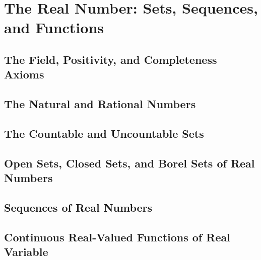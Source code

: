 \section{The Real Number: Sets, Sequences, and Functions}

\subsection{The Field, Positivity, and Completeness Axioms}


\subsection{The Natural and Rational Numbers}


\subsection{The Countable and Uncountable Sets}


\subsection{Open Sets, Closed Sets, and Borel Sets of Real Numbers}


\subsection{Sequences of Real Numbers}


\subsection{Continuous Real-Valued Functions of Real Variable}
